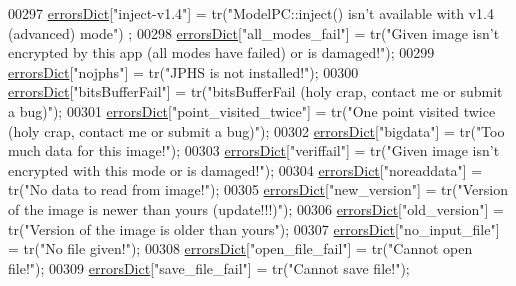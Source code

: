 \begin{DoxyCode}
00297     \hyperlink{class_view_p_c_aaf7f058e5589d65fec72a21abfd5629b}{errorsDict}[\textcolor{stringliteral}{"inject-v1.4"}] = tr(\textcolor{stringliteral}{"ModelPC::inject() isn't available with v1.4 (advanced) mode"})
      ;
00298     \hyperlink{class_view_p_c_aaf7f058e5589d65fec72a21abfd5629b}{errorsDict}[\textcolor{stringliteral}{"all\_modes\_fail"}] = tr(\textcolor{stringliteral}{"Given image isn't encrypted by this app (all modes have
       failed) or is damaged!"});
00299     \hyperlink{class_view_p_c_aaf7f058e5589d65fec72a21abfd5629b}{errorsDict}[\textcolor{stringliteral}{"nojphs"}] = tr(\textcolor{stringliteral}{"JPHS is not installed!"});
00300     \hyperlink{class_view_p_c_aaf7f058e5589d65fec72a21abfd5629b}{errorsDict}[\textcolor{stringliteral}{"bitsBufferFail"}] = tr(\textcolor{stringliteral}{"bitsBufferFail (holy crap, contact me or submit a bug)"});
00301     \hyperlink{class_view_p_c_aaf7f058e5589d65fec72a21abfd5629b}{errorsDict}[\textcolor{stringliteral}{"point\_visited\_twice"}] = tr(\textcolor{stringliteral}{"One point visited twice (holy crap, contact me or
       submit a bug)"});
00302     \hyperlink{class_view_p_c_aaf7f058e5589d65fec72a21abfd5629b}{errorsDict}[\textcolor{stringliteral}{"bigdata"}] = tr(\textcolor{stringliteral}{"Too much data for this image!"});
00303     \hyperlink{class_view_p_c_aaf7f058e5589d65fec72a21abfd5629b}{errorsDict}[\textcolor{stringliteral}{"veriffail"}] = tr(\textcolor{stringliteral}{"Given image isn't encrypted with this mode or is damaged!"});
00304     \hyperlink{class_view_p_c_aaf7f058e5589d65fec72a21abfd5629b}{errorsDict}[\textcolor{stringliteral}{"noreaddata"}] = tr(\textcolor{stringliteral}{"No data to read from image!"});
00305     \hyperlink{class_view_p_c_aaf7f058e5589d65fec72a21abfd5629b}{errorsDict}[\textcolor{stringliteral}{"new\_version"}] = tr(\textcolor{stringliteral}{"Version of the image is newer than yours (update!!!)"});
00306     \hyperlink{class_view_p_c_aaf7f058e5589d65fec72a21abfd5629b}{errorsDict}[\textcolor{stringliteral}{"old\_version"}] = tr(\textcolor{stringliteral}{"Version of the image is older than yours"});
00307     \hyperlink{class_view_p_c_aaf7f058e5589d65fec72a21abfd5629b}{errorsDict}[\textcolor{stringliteral}{"no\_input\_file"}] = tr(\textcolor{stringliteral}{"No file given!"});
00308     \hyperlink{class_view_p_c_aaf7f058e5589d65fec72a21abfd5629b}{errorsDict}[\textcolor{stringliteral}{"open\_file\_fail"}] = tr(\textcolor{stringliteral}{"Cannot open file!"});
00309     \hyperlink{class_view_p_c_aaf7f058e5589d65fec72a21abfd5629b}{errorsDict}[\textcolor{stringliteral}{"save\_file\_fail"}] = tr(\textcolor{stringliteral}{"Cannot save file!"});

\end{DoxyCode}
